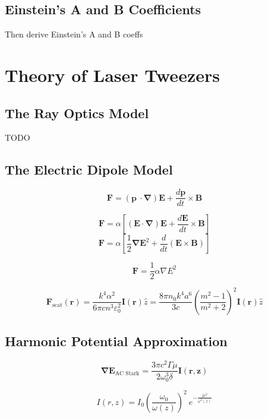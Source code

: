 \documentclass{article}
\begin{document}
\subsection*{Einstein's A and B Coefficients}
Then derive Einstein's A and B coeffs





\section*{Theory of Laser Tweezers}


\subsection*{The Ray Optics Model}

TODO


\subsection*{The Electric Dipole Model}

\[ \mathbf{F} = (\mathbf{p}\ \cdot\mathbf{\nabla})\mathbf{E} + \frac{d\mathbf{p}}{dt}\times\mathbf{B} \]


\[ \mathbf{F} = \alpha\left[ (\mathbf{E}\cdot\mathbf{\nabla})\mathbf{E} + \frac{d\mathbf{E}}{dt}\times\mathbf{B} \right]  \]
\[ \mathbf{F} = \alpha\left[ \frac{1}{2}\mathbf{\nabla}\mathbf{E}^2 + \frac{d}{dt}(\mathbf{E}\times\mathbf{B}) \right]  \]

\[ \mathbf{F} = \frac{1}{2}\alpha\nabla E^2 \]

\[ \mathbf{F}_\text{scat}(\mathbf{r}) = \frac{k^4\alpha^2}{6\pi cn^3\varepsilon_0^2}\mathbf{I}(\mathbf{r})\hat{z} = \frac{8\pi n_0k^4a^6}{3c}\left( \frac{m^2-1}{m^2+2} \right)^2\mathbf{I}(\mathbf{r})\hat{z}  \]

\subsection*{Harmonic Potential Approximation}

\[ \mathbf{\nabla E}_\text{AC Stark} = \frac{3\pi c^2\Gamma\mu}{2\omega_0^3\delta}\mathbf{I(r,z)}  \]

\[ I(r,z) = I_0 \left( \frac{\omega_0}{\omega(z)} \right)^2\ e^{\displaystyle -\frac{2r^2}{\omega^2(z)}}  \]
\end{document}
